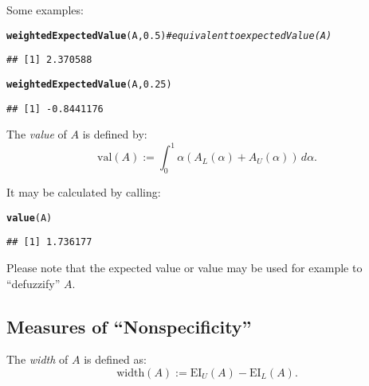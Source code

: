 \documentclass[11pt]{article}\usepackage[]{graphicx}\usepackage[]{color}
\makeatletter
\newcommand{\hlnum}[1]{\textcolor[rgb]{0.686,0.059,0.569}{#1}}%
\newcommand{\hlcom}[1]{\textcolor[rgb]{0.678,0.584,0.686}{\textit{#1}}}%
\newcommand{\hlstd}[1]{\textcolor[rgb]{0.345,0.345,0.345}{#1}}%
\newcommand{\hlkwd}[1]{\textcolor[rgb]{0.737,0.353,0.396}{\textbf{#1}}}%
\newenvironment{kframe}{%
 \def\at@end@of@kframe{}%
 \ifinner\ifhmode%
  \def\at@end@of@kframe{\end{minipage}}%
  \begin{minipage}{\columnwidth}%
 \fi\fi%
 \def\FrameCommand##1{\hskip\@totalleftmargin \hskip-\fboxsep
 \colorbox{shadecolor}{##1}\hskip-\fboxsep
     \hskip-\linewidth \hskip-\@totalleftmargin \hskip\columnwidth}%
 \MakeFramed {\advance\hsize-\width
   \@totalleftmargin\z@ \linewidth\hsize
   \@setminipage}}%
 {\par\unskip\endMakeFramed%
 \at@end@of@kframe}
\newenvironment{knitrout}{}{} %
\makeatother
\begin{document}
\noindent
Some examples:

\begin{knitrout}\small
{}\color{fgcolor}\begin{kframe}
\begin{alltt}
\hlkwd{weightedExpectedValue}\hlstd{(A,} \hlnum{0.5}\hlstd{)} \hlcom{# equivalent to expectedValue(A)}
\end{alltt}
\begin{verbatim}
## [1] 2.370588
\end{verbatim}
\begin{alltt}
\hlkwd{weightedExpectedValue}\hlstd{(A,} \hlnum{0.25}\hlstd{)}
\end{alltt}
\begin{verbatim}
## [1] -0.8441176
\end{verbatim}
\end{kframe}
\end{knitrout}

\bigskip
The \textit{value} of $A$ \cite{DelgadoETAL1998:canonicalfn} is defined by:
\begin{equation}
\mathrm{val}(A) := \int_0^1 \alpha\left(A_L(\alpha)+A_U(\alpha)\right)\,d\alpha.
\end{equation}

\noindent
It may be calculated by calling:

\begin{knitrout}\small
{}\color{fgcolor}\begin{kframe}
\begin{alltt}
\hlkwd{value}\hlstd{(A)}
\end{alltt}
\begin{verbatim}
## [1] 1.736177
\end{verbatim}
\end{kframe}
\end{knitrout}

\noindent
Please note that the expected value or  value
may be used for example to ``defuzzify'' $A$.


\subsection{Measures of ``Nonspecificity''}


The \textit{width} of $A$ \cite{Chanas2001:intervapproxfn} is defined as:
\begin{equation}
\mathrm{width}(A) := \mathrm{EI}_U(A) - \mathrm{EI}_L(A).
\end{equation}
\end{document}
